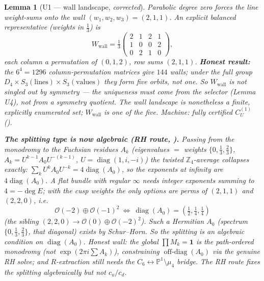 \documentclass[11pt,a4paper]{article}
\newcommand{\PP}{\mathbb P^1}
\newcommand{\Z}{\mathbb Z}
\newtheorem{lemma}{Lemma}
\begin{document}
\begin{lemma}[U1 --- wall landscape, \emph{corrected}]
Parabolic degree zero forces the line weight-sums onto the wall $(w_1,w_2,w_3)=(2,1,1)$. An explicit
balanced representative (weights in $\tfrac13$) is
\[
  W_{\mathrm{wall}}=\tfrac13\begin{pmatrix}2&1&2&1\\1&0&0&2\\0&2&1&0\end{pmatrix},
\]
each column a permutation of $(0,1,2)$, row sums $(2,1,1)$. \textbf{Honest result:}
the $6^4{=}1296$ column-permutation matrices give $144$ walls; under the \emph{full} group
$D_4\times S_3(\text{lines})\times S_3(\text{values})$ they form \emph{five} orbits, \emph{not one}. So
$W_{\mathrm{wall}}$ is \emph{not} singled out by symmetry --- the uniqueness must come from the selector
(Lemma U4), not from a symmetry quotient. The wall landscape is nonetheless a finite, explicitly
enumerated set; $W_{\mathrm{wall}}$ is one of the five. Machine: fully certified $C_U^{(1)}$
().

\smallskip
\noindent\textbf{The splitting type is now algebraic (RH route, ).} Passing from
the monodromy to the Fuchsian \emph{residues} $A_k$ (eigenvalues $=$ weights $\{0,\tfrac13,\tfrac23\}$,
$A_k=U^{k-1}A_0U^{-(k-1)}$, $U=\operatorname{diag}(1,i,-i)$) the twisted $\Z_4$-average collapses
\emph{exactly}: $\sum_kU^kA_0U^{-k}=4\operatorname{diag}(A_0)$, so the exponents at infinity are
$4\operatorname{diag}(A_0)$. A flat bundle with regular $\infty$ needs integer exponents summing to
$4{=}-\deg E$; with the cusp weights the only options are perms of $(2,1,1)$ and $(2,2,0)$, i.e.
\[
  \boxed{\ \mathcal O(-2)\!\oplus\!\mathcal O(-1)^2\ \Longleftrightarrow\ \operatorname{diag}(A_0)=(\tfrac12,\tfrac14,\tfrac14)\ }
\]
(the sibling $(2,2,0)\to\mathcal O(0)\oplus\mathcal O(-2)^2$). Such a Hermitian $A_0$ (spectrum
$\{0,\tfrac13,\tfrac23\}$, that diagonal) exists by Schur--Horn. So the \emph{splitting} is an algebraic
condition on $\operatorname{diag}(A_0)$. \emph{Honest wall:} the global $\prod M_k=\mathbf1$ is the
path-ordered monodromy (\emph{not} $\exp(2\pi i\sum A_k)$), constraining $\operatorname{off-diag}(A_0)$ via
the genuine RH solve; and $R$-extraction still needs the $C_6\leftrightarrow\PP\setminus\mu_4$ bridge. The
RH route fixes the \emph{splitting} algebraically but not $c_u/c_d$.
\end{lemma}
\end{document}
